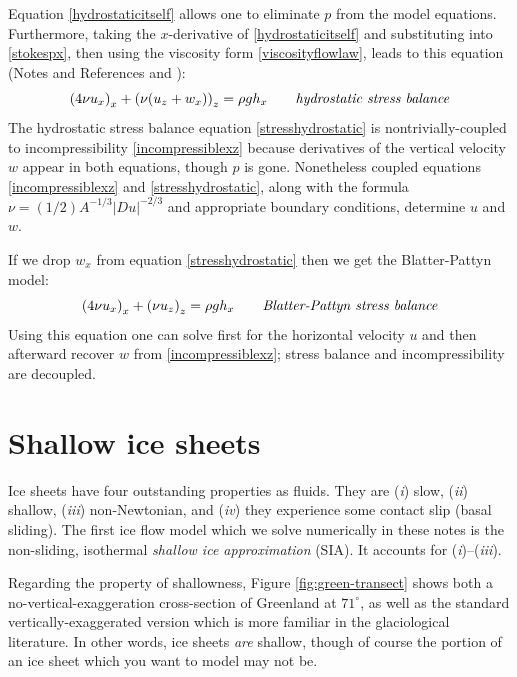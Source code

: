 \documentclass[letterpaper,final,12pt,reqno]{amsart}
\begin{document}
Equation \eqref{hydrostaticitself} allows one to eliminate $p$ from the model equations.  Furthermore, taking the $x$-derivative of \eqref{hydrostaticitself} and substituting into \eqref{stokespx}, then using the viscosity form \eqref{viscosityflowlaw}, leads to this equation (Notes and References and \cite{GreveBlatter2009}):
\begin{equation}
\left(4 \nu u_x\right)_x + \left(\nu (u_z+w_x)\right)_z = \rho g h_x \qquad\text{\emph{hydrostatic stress balance}} \label{stresshydrostatic}
\end{equation}
The hydrostatic stress balance equation \eqref{stresshydrostatic} is nontrivially-coupled to incompressibility \eqref{incompressiblexz} because derivatives of the vertical velocity $w$ appear in both equations, though $p$ is gone.  Nonetheless coupled equations \eqref{incompressiblexz} and \eqref{stresshydrostatic}, along with the formula $\nu = (1/2) A^{-1/3} |Du|^{-2/3}$ and appropriate boundary conditions, determine $u$ and $w$.

If we drop $w_x$ from equation \eqref{stresshydrostatic} then we get the Blatter-Pattyn model:
\begin{equation}
\left(4 \nu u_x\right)_x + \left(\nu u_z\right)_z = \rho g h_x \qquad\text{\emph{Blatter-Pattyn stress balance}} \label{stressblatter}
\end{equation}
Using this equation one can solve first for the horizontal velocity $u$ and then afterward recover $w$ from \eqref{incompressiblexz}; stress balance and incompressibility are decoupled.

\section{Shallow ice sheets}

Ice sheets have four outstanding properties as fluids.  They are (\emph{i}) slow, (\emph{ii}) shallow,  (\emph{iii}) non-Newtonian, and (\emph{iv}) they experience some contact slip (basal sliding).  The first ice flow model which we solve numerically in these notes is the non-sliding, isothermal \emph{shallow ice approximation} (SIA).  It accounts for (\emph{i})--(\emph{iii}).

Regarding the property of shallowness, Figure \ref{fig:green-transect} shows both a no-vertical-exaggeration cross-section of Greenland at $71^\circ$, as well as the standard vertically-exaggerated version which is more familiar in the glaciological literature.  In other words, ice sheets \emph{are} shallow, though of course the portion of an ice sheet which you want to model may not be.
\end{document}
